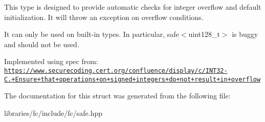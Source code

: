 This type is designed to provide automatic checks for integer overflow and default initialization. It will throw an exception on overflow conditions.

It can only be used on built-\/in types. In particular, safe$<$uint128\+\_\+t$>$ is buggy and should not be used.

Implemented using spec from\+: \href{https://www.securecoding.cert.org/confluence/display/c/INT32-C.+Ensure+that+operations+on+signed+integers+do+not+result+in+overflow}{\tt https\+://www.\+securecoding.\+cert.\+org/confluence/display/c/\+I\+N\+T32-\/\+C.+\+Ensure+that+operations+on+signed+integers+do+not+result+in+overflow} 

The documentation for this struct was generated from the following file\+:\begin{DoxyCompactItemize}
\item 
libraries/fc/include/fc/safe.\+hpp\end{DoxyCompactItemize}
